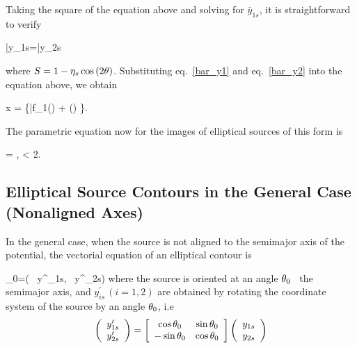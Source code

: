 Taking the square of the equation above and solving for $\bar{y}_{1s}$, it is
straightforward to verify

\beq
\bar{y}_{1s}=\bar{y}_{2s}\pm {}
\eeq

where $S=1-\eta_s\cos{(2\theta)}$. Substituting eq.~\eqref{bar_y1} and
eq.~\eqref{bar_y2} into the equation above, we obtain

\beq
x =  \left\{\bar{f}_{1}(\theta) +
\left(\right) \pm {}  \right\}.
\label{elliptical_contour}
\eeq

The parametric equation now for the images of elliptical sources of this form is

\beq
{}= ,  \leq \te <
2\pi.
\eeq


\subsection{Elliptical Source Contours in the General Case (Nonaligned Axes)}

In the general case, when the source is not aligned to the semimajor axis of the
potential, the vectorial equation of an elliptical contour is

\beq
\label{eq:ellipsetheta}
_0=\left( \, y^\prime_{1s}, \,
y^\prime_{2s}\right)
\eeq
where the source is oriented at an angle
$\theta_0$ \wrt\ the  semimajor axis,  and $y^\prime_{is}\, (i=1,2)$ are obtained
by rotating the coordinate system of the source by an angle $\theta_0$,
i.e
\begin{equation}
\left(\begin{array}{c}y^\prime_{1s} \\ y^\prime_{2s}
\end{array}\right)=\left[\begin{array}{c c}%
\cos{\te_0} & \sin{\te_0}\\ -\sin{\te_0} & \cos{\te_0} \end{array} \right]\left(
\begin{array}{c} y_{1s}\\ y_{2s}\end{array}\right)
\end{equation}

